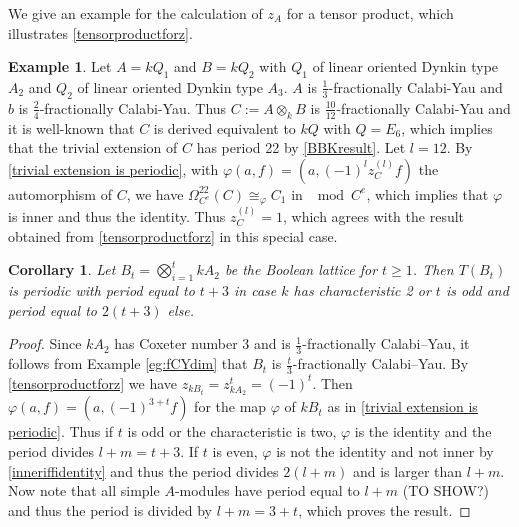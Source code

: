 \documentclass[a4paper,reqno,11pt]{amsart}
\newtheorem{corollary}[theorem]{Corollary}
\newtheorem{proposition}[theorem]{Proposition}
\theoremstyle{definition}
\newtheorem{example}[theorem]{Example}
\newcommand{\new}[1]{{\blue #1}}
\newcommand{\old}[1]{{\red #1}}
\numberwithin{equation}{section}
\begin{document}
\new{
We give an example for the calculation of $z_A$ for a tensor product, which illustrates \ref{tensorproductforz}.
\begin{example}
Let $A=kQ_1$ and $B=kQ_2$ with $Q_1$ of linear oriented Dynkin type $A_2$ and $Q_2$ of linear oriented Dynkin type $A_3$.
$A$ is $\frac{1}{3}$-fractionally Calabi-Yau and $b$ is $\frac{2}{4}$-fractionally Calabi-Yau. Thus $C:= A \otimes_k B$ is $\frac{10}{12}$-fractionally Calabi-Yau and it is well-known that $C$ is derived equivalent to $k Q$ with $Q=E_6$, which implies that the trivial extension of $C$ has period 22 by \ref{BBKresult}.
Let $l=12$.
By \ref{trivial extension is periodic}, with $\varphi(a,f)=(a,(-1)^l z_C^{(l)} f)$ the automorphism of $C$, we have $\Omega_{C^e}^{22}(C) \cong _{\varphi}C_1$ in $\mod C^e$, which implies that $\varphi$ is inner and thus the identity. 
Thus $z_C^{(l)}=1$, which agrees with the result obtained from \ref{tensorproductforz} in this special case.
\end{example}}



\begin{corollary}
Let $B_t=\bigotimes\limits_{i=1}^{t}{k A_2}$ be the Boolean lattice for $t \geq 1$.
Then $T(B_t)$ is periodic with period equal to $t+3$ in case $k$ has characteristic 2 or $t$ is odd and period equal to $2(t+3)$ else.

\end{corollary}

\begin{proof}
Since $kA_2$ has Coxeter number $3$ and is $\frac{1}{3}$-fractionally Calabi--Yau, it follows from Example \ref{eg:fCYdim} that $B_t$ is $\frac{t}{3}$-fractionally Calabi--Yau. 
By \ref{tensorproductforz} we have $z_{kB_t} = z_{kA_2}^t=(-1)^{t}$.
Then $\varphi(a,f)=(a,(-1)^{3+t}f)$ for the map $\varphi$ of $kB_t$ as in \ref{trivial extension is periodic}.
Thus if $t$ is odd or the characteristic is two, $\varphi$ is the identity and the period divides $l+m=t+3$. If $t$ is even, $\varphi$ is not the identity and not inner by \ref{inneriffidentity} and thus the period divides $2(l+m)$ and is larger than $l+m$.
Now note that all simple $A$-modules have period equal to $l+m$ (TO SHOW?) and thus the period is divided by $l+m=3+t$, which proves the result.
\end{proof}
\end{document}
